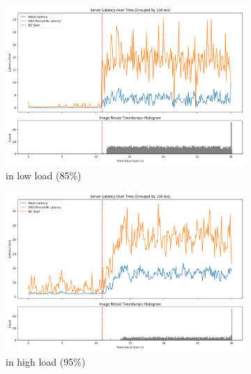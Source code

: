 \begin{figure}[t]
    \centering
    \begin{subfigure}[t]{\columnwidth}
        \includegraphics[width=\columnwidth]{graphs/srv-bg-idle-low.png}
        \caption{\schedidle{} in low load (85\%)}\label{fig:srv-bg-idle-low}
        \vspace{12pt}
    \end{subfigure}
    \hspace{\fill}
    \begin{subfigure}[t]{\columnwidth}
        \includegraphics[width=\columnwidth]{graphs/srv-bg-idle-high.png}
        \caption{\schedidle{} in high load (95\%)}\label{fig:srv-bg-idle-high}
        \vspace{12pt}
    \end{subfigure}
    \hspace{\fill}
    \begin{subfigure}[t]{\columnwidth}

\end{subfigure}
\end{figure}
